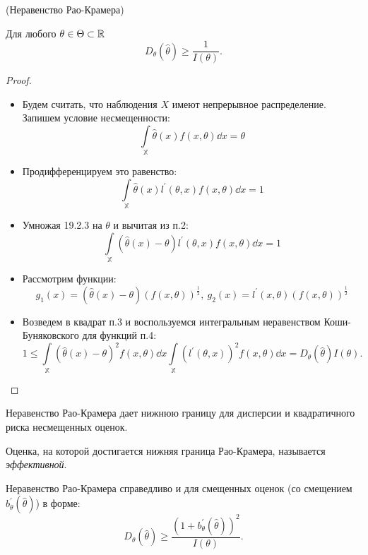 \begin{theorem}(Неравенство Рао-Крамера)

	Для любого $\theta \in \Theta \subset \mathbb{R}$
	\[
		D_{\theta}(\hat{\theta}) \geqslant \frac{1}{I(\theta)}
	.\]
\end{theorem}
\begin{proof}
	\enewline
        \begin{itemize}
		\item Будем считать, что наблюдения $X$ имеют непрерывное распределение. Запишем условие несмещенности:
			\[
				\int\limits_{\mathbb{X}} \hat{\theta}(x)f(x,\theta) \dd x = \theta
			\]
		\item Продифференцируем это равенство:
			\[
				\int\limits_{\mathbb{X}} \hat{\theta}(x)l^{'}(\theta,x)f(x,\theta) \dd x = 1
			\]
		\item Умножая 19.2.3 на $\theta$ и вычитая из п.2:
			\[
				\int\limits_{\mathbb{X}} (\hat{\theta}(x) - \theta)l^{'}(\theta,x)f(x,\theta) \dd x = 1
			\]
		\item Рассмотрим функции:
			\[
				g_1(x) = (\hat{\theta}(x) - \theta)(f(x, \theta))^{\frac{1}{2}},~ g_2(x) = l^{'}(x, \theta)(f(x, \theta))^{\frac{1}{2}}
			\]
		\item Возведем в квадрат п.3 и воспользуемся интегральным неравенством Коши-Буняковского для функций п.4:
			\[
				1 \leqslant \int\limits_{\mathbb{X}} (\hat{\theta}(x) - \theta)^2f(x,\theta) \dd x \int\limits_{\mathbb{X}} (l^{'}(\theta,x))^2f(x,\theta) \dd x = D_{\theta}(\hat{\theta})I(\theta)
			.\]
	\end{itemize}
\end{proof}

Неравенство Рао-Крамера дает нижнюю границу для дисперсии и квадратичного риска несмещенных оценок.

\begin{definition}
	Оценка, на которой достигается нижняя граница Рао-Крамера, называется \textit{эффективной}.
\end{definition}

\begin{remark}
	Неравенство Рао-Крамера справедливо и для смещенных оценок (со смещением $b^{'}_{\theta}(\hat{\theta})$) в форме:
	\[
		D_{\theta}(\hat{\theta}) \geqslant \frac{(1 + b^{'}_{\theta}(\hat{\theta}))^2}{I(\theta)}
	.\]
\end{remark}
